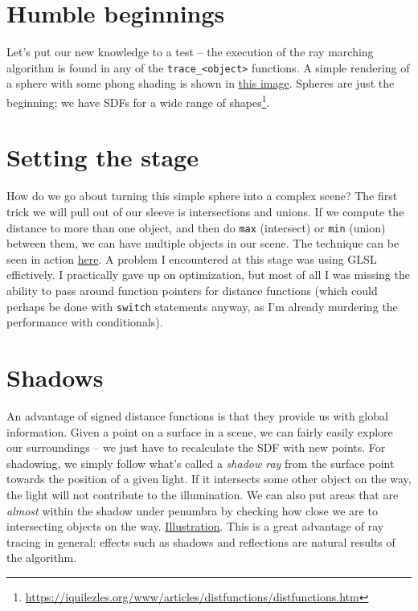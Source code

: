 \documentclass[abstract=off,oneside]{scrreprt}
\begin{document}
\section*{Humble beginnings}
\label{sec-4}
\label{sec:beginnings}
Let's put our new knowledge to a test -- the execution of the ray
marching algorithm is found in any of the \verb~trace_<object>~
functions. A simple rendering of a sphere with some phong shading is
shown in \hyperref[fig:simplesphere]{this image}. Spheres are just the beginning; we have SDFs for
a wide range of shapes\footnote{\url{https://iquilezles.org/www/articles/distfunctions/distfunctions.htm}}.

\section*{Setting the stage}
\label{sec-5}
\label{sec:creatingascene}
How do we go about turning this simple sphere into a complex scene?
The first trick we will pull out of our sleeve is intersections and
unions. If we compute the distance to more than one object, and then
do \verb~max~ (intersect) or \verb~min~ (union) between them, we can have
multiple objects in our scene. The technique can be seen in action
\hyperref[fig:union]{here}. A problem I encountered at this stage was using GLSL
effictively. I practically gave up on optimization, but most of all I
was missing the ability to pass around function pointers for distance
functions (which could perhaps be done with \verb~switch~ statements
anyway, as I'm already murdering the performance with conditionals).

\section*{Shadows}
\label{sec-6}
\label{sec:shadows} An advantage of signed distance functions is that they
provide us with global information. Given a point on a surface in a
scene, we can fairly easily explore our surroundings -- we just have
to recalculate the SDF with new points. For shadowing, we simply
follow what's called a \emph{shadow ray} from the surface point towards the
position of a given light. If it intersects some other object on the
way, the light will not contribute to the illumination. We can also
put areas that are \emph{almost} within the shadow under penumbra by
checking how close we are to intersecting objects on the
way. \hyperref[fig:penumbra]{Illustration}. This is a great advantage of ray tracing in
general: effects such as shadows and reflections are natural results
of the algorithm.
\end{document}

